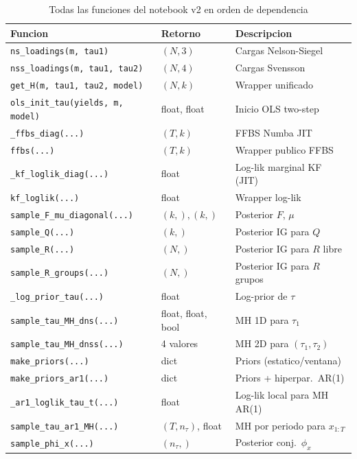 \documentclass[12pt, a4paper]{article}
\theoremstyle{plain}
\theoremstyle{definition}
\theoremstyle{remark}
\begin{document}
\begin{table}[H]
\centering
\caption{Todas las funciones del notebook v2 en orden de dependencia}
\label{tab:funciones}
\small
{}
\begin{tabular}{L{4.5cm} L{2.5cm} L{7cm}}
\toprule
{}
\color{white}\textbf{Funcion} &
\color{white}\textbf{Retorno} &
\color{white}\textbf{Descripcion} \\
\midrule
\texttt{ns\_loadings(m, tau1)} & $(N,3)$ & Cargas Nelson-Siegel \\
\texttt{nss\_loadings(m, tau1, tau2)} & $(N,4)$ & Cargas Svensson \\
\texttt{get\_H(m, tau1, tau2, model)} & $(N,k)$ & Wrapper unificado \\
\texttt{ols\_init\_tau(yields, m, model)} & float, float & Inicio OLS two-step \\
\texttt{\_ffbs\_diag(...)} & $(T,k)$ & FFBS Numba JIT \\
\texttt{ffbs(...)} & $(T,k)$ & Wrapper publico FFBS \\
\texttt{\_kf\_loglik\_diag(...)} & float & Log-lik marginal KF (JIT) \\
\texttt{kf\_loglik(...)} & float & Wrapper log-lik \\
\texttt{sample\_F\_mu\_diagonal(...)} & $(k,),(k,)$ & Posterior $F$, $\mu$ \\
\texttt{sample\_Q(...)} & $(k,)$ & Posterior IG para $Q$ \\
\texttt{sample\_R(...)} & $(N,)$ & Posterior IG para $R$ libre \\
\texttt{sample\_R\_groups(...)} & $(N,)$ & Posterior IG para $R$ grupos \\
\texttt{\_log\_prior\_tau(...)} & float & Log-prior de $\tau$ \\
\texttt{sample\_tau\_MH\_dns(...)} & float, float, bool & MH 1D para $\tau_1$ \\
\texttt{sample\_tau\_MH\_dnss(...)} & 4 valores & MH 2D para $(\tau_1,\tau_2)$ \\
\texttt{make\_priors(...)} & dict & Priors (estatico/ventana) \\
\texttt{make\_priors\_ar1(...)} & dict & Priors + hiperpar.\ AR(1) \\
\texttt{\_ar1\_loglik\_tau\_t(...)} & float & Log-lik local para MH AR(1) \\
\texttt{sample\_tau\_ar1\_MH(...)} & $(T,n_\tau)$, float & MH por periodo para $x_{1:T}$ \\
\texttt{sample\_phi\_x(...)} & $(n_\tau,)$ & Posterior conj.\ $\phi_x$ \\

\end{tabular}
\end{table}
\end{document}
